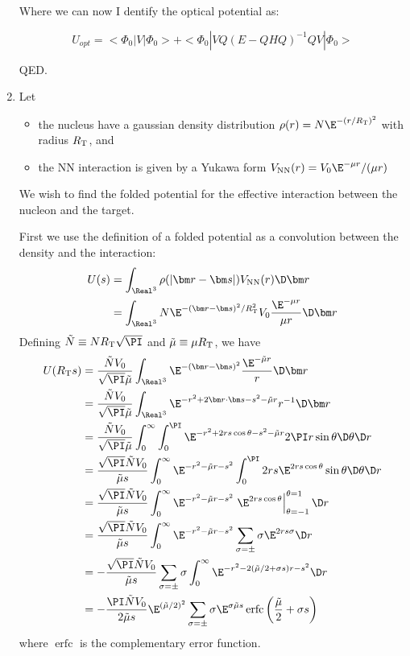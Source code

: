 \documentclass[fleqn, 12pt]{article}
\begin{document}
\begin{enumerate}
Where we can now I dentify the optical potential as:

\[
U_{opt}=<\Phi_{0}|V|\Phi_{0}>+<\Phi_{0}|VQ(E-QHQ)^{-1}QV|\Phi_{0}>
\]


QED.

\item Let
  \begin{itemize}
  \item the nucleus have a gaussian density distribution
    $\rho(r) = N \E^{-(r / R_{\text T})^2}$ with radius $R_{\text T}$, and
  \item the NN interaction is given by a Yukawa form
    $V_{\text{NN}}(r) = V_0 \E^{-\mu r} / (\mu r)$
  \end{itemize}
  We wish to find the folded potential for the effective interaction between
  the nucleon and the target.

  First we use the definition of a folded potential as a convolution between
  the density and the interaction:
  \begin{align*}
    U(s)
    &= \int_{\Real^3} \rho(|\bm r - \bm s|) V_{\text{NN}}(r) \D \bm r \\
    &= \int_{\Real^3} N \E^{-(\bm r - \bm s)^2/R_{\text T}^2} V_0 \frac{\E^{-\mu r}}{\mu r} \D \bm r
  \end{align*}
  Defining $\tilde N \equiv N R_{\text T} \sqrt\PI$ and
  $\tilde \mu \equiv \mu R_{\text T}$, we have
  \begin{align*}
    U(R_{\text T} s)
    &= \frac{\tilde N V_0}{\sqrt\PI \tilde\mu}
      \int_{\Real^3} \E^{-(\bm r - \bm s)^2} \frac{\E^{-\tilde\mu r}}{r} \D \bm r
    \\
    &= \frac{\tilde N V_0}{\sqrt\PI \tilde\mu} \int_{\Real^3} \E^{-r^2 + 2 \bm r \cdot \bm s - s^2 - \tilde\mu r} r^{-1} \D \bm r
    \\
    &= \frac{\tilde N V_0}{\sqrt\PI \tilde\mu} \int_0^\infty \int_0^\PI \E^{-r^2 + 2 r s \cos \theta - s^2 - \tilde\mu r} 2 \PI r \sin \theta \D \theta \D r
    \\
    &= \frac{\sqrt\PI \tilde N V_0}{\tilde\mu s} \int_0^\infty \E^{-r^2 - \tilde\mu r - s^2} \int_0^\PI 2 r s \E^{2 r s \cos \theta} \sin \theta \D \theta \D r
    \\
    &= \frac{\sqrt\PI \tilde N V_0}{\tilde\mu s} \int_0^\infty \E^{-r^2 - \tilde\mu r - s^2} \left.\E^{2 r s \cos \theta}\right|_{\theta=-1}^{\theta=1} \D r
    \\
    &= \frac{\sqrt\PI \tilde N V_0}{\tilde\mu s} \int_0^\infty \E^{-r^2 - \tilde\mu r - s^2} \sum_{\sigma = \pm} \sigma \E^{2 r s \sigma} \D r
    \\
    &= -\frac{\sqrt\PI \tilde N V_0}{\tilde\mu s} \sum_{\sigma = \pm} \sigma \int_0^\infty \E^{-r^2 - 2 (\tilde\mu / 2 + \sigma s) r - s^2}\D r
    \\
    &= -\frac{\PI \tilde N V_0}{2 \tilde\mu s} \E^{(\tilde\mu / 2)^2} \sum_{\sigma  = \pm} \sigma \E^{\sigma \tilde\mu s} \operatorname{erfc}\left(\frac{\tilde\mu}{2} + \sigma s\right)
  \end{align*}
where $\operatorname{erfc}$ is the complementary error function.

\end{enumerate}
\end{document}

